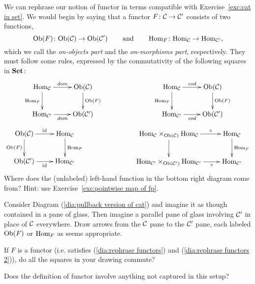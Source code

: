 \documentclass[CT4S-EN-RU]{subfiles}
\begin{document}
\begin{exerciseRUS}\label{exc:list as functor}
\end{exerciseRUS}

\begin{exerciseENG}\label{exc:rephrase functors}
We can rephrase our notion of functor in terms compatible with Exercise~\ref{exc:cat in set}. We would begin by saying that a functor $F\colon\mathcal{C}\rightarrow\mathcal{C}'$ consists of two functions, $$\textnormal{Ob}(F)\colon\textnormal{Ob}(\mathcal{C})\rightarrow\textnormal{Ob}(\mathcal{C}')\hspace{.3in}\textnormal{and}\hspace{.3in}\textnormal{Hom}_F\colon\textnormal{Hom}_\mathcal{C}\rightarrow\textnormal{Hom}_{\mathcal{C}'},$$ which we call the {\em on-objects part} and the {\em on-morphisms part}, respectively. They must follow some rules, expressed by the commutativity of the following squares in ${\mathbf{Set}}$:
\begin{align}\label{dia:rephrase functors}
\xymatrix{
\Hom_\mcC\ar[r]^{dom}\ar[d]_{\Hom_F}&\Ob(\mcC)\ar[d]^{\Ob(F)}\\
\Hom_{\mcC'}\ar[r]_{dom}&\Ob(\mcC')
}
\hspace{1in}
\xymatrix{
\Hom_\mcC\ar[r]^{cod}\ar[d]_{\Hom_F}&\Ob(\mcC)\ar[d]^{\Ob(F)}\\
\Hom_{\mcC'}\ar[r]_{cod}&\Ob(\mcC')}
\end{align}
\begin{align}\label{dia:rephrase functors 2}
\xymatrix{
\Ob(\mcC)\ar[d]_{\Ob(F)}\ar[r]^{\id}&\Hom_\mcC\ar[d]^{\Hom_F}\\
\Ob(\mcC')\ar[r]_{\id}&\Hom_{\mcC'}
}
\hspace{1in}
\xymatrix{
\Hom_\mcC\times_{\Ob(\mcC)}\Hom_{\mcC}\ar[r]^-{\circ}\ar[d]_{}&\Hom_\mcC\ar[d]^{\Hom_F}\\
\Hom_{\mcC'}\times_{\Ob(\mcC')}\Hom_{\mcC'}\ar[r]_-{\circ}&\Hom_{\mcC'}}
\end{align}
Where does the (unlabeled) left-hand function in the bottom right diagram come from? Hint: use Exercise~\ref{exc:pointwise map of fp}.

Consider Diagram (\ref{dia:pullback version of cat}) and imagine it as though contained in a pane of glass. Then imagine a parallel pane of glass involving $\mathcal{C}'$ in place of $\mathcal{C}$ everywhere. 
\sexc Draw arrows from the $\mathcal{C}$ pane to the $\mathcal{C}'$ pane, each labeled $\textnormal{Ob}(F)$ or $\textnormal{Hom}_F$ as seems appropriate.
\item If $F$ is a functor (i.e. satisfies (\ref{dia:rephrase functors}) and (\ref{dia:rephrase functors 2})), do all the squares in your drawing commute?
\item  Does the definition of functor involve anything not captured in this setup?
\endsexc
\end{exerciseENG}
\end{document}
